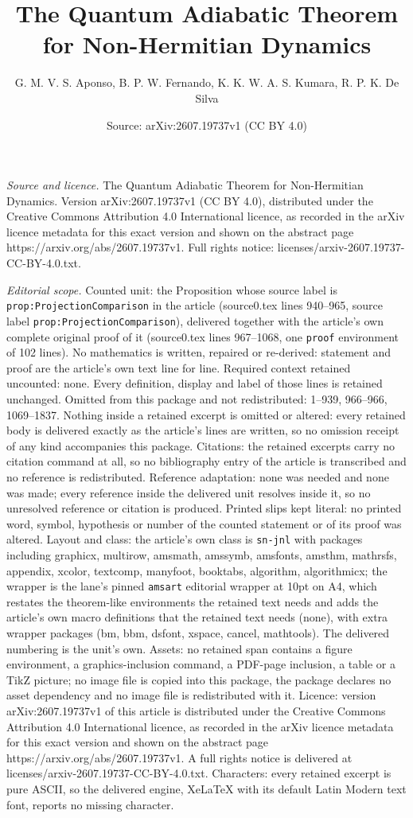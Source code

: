 \documentclass[10pt,a4paper]{amsart}
\title[The Quantum Adiabatic Theorem for Non-Hermitian Dynamics]{The Quantum Adiabatic Theorem for Non-Hermitian Dynamics}
\author{G. M. V. S. Aponso, B. P. W. Fernando, K. K. W. A. S. Kumara, R. P. K. De Silva}
\date{Source: arXiv:2607.19737v1 (CC BY 4.0)}
\begin{document}
\maketitle

\noindent\emph{Source and licence.} The Quantum Adiabatic Theorem for Non-Hermitian Dynamics. Version arXiv:2607.19737v1 (CC BY 4.0), distributed under the Creative Commons Attribution 4.0 International licence, as recorded in the arXiv licence metadata for this exact version and shown on the abstract page https://arxiv.org/abs/2607.19737v1. Full rights notice: licenses/arxiv-2607.19737-CC-BY-4.0.txt.\par\smallskip

\noindent\textit{Editorial scope.} Counted unit: the Proposition whose source label is \texttt{prop:ProjectionComparison} in the article (source0.tex lines 940--965, source label \texttt{prop:ProjectionComparison}), delivered together with the article's own complete original proof of it (source0.tex lines 967--1068, one \texttt{proof} environment of 102 lines). No mathematics is written, repaired or re-derived: statement and proof are the article's own text line for line. Required context retained uncounted: none. Every definition, display and label of those lines is retained unchanged. Omitted from this package and not redistributed: 1--939, 966--966, 1069--1837. Nothing inside a retained excerpt is omitted or altered: every retained body is delivered exactly as the article's lines are written, so no omission receipt of any kind accompanies this package. Citations: the retained excerpts carry no citation command at all, so no bibliography entry of the article is transcribed and no reference is redistributed. Reference adaptation: none was needed and none was made; every reference inside the delivered unit resolves inside it, so no unresolved reference or citation is produced. Printed slips kept literal: no printed word, symbol, hypothesis or number of the counted statement or of its proof was altered. Layout and class: the article's own class is \texttt{sn-jnl} with packages including graphicx, multirow, amsmath, amssymb, amsfonts, amsthm, mathrsfs, appendix, xcolor, textcomp, manyfoot, booktabs, algorithm, algorithmicx; the wrapper is the lane's pinned \texttt{amsart} editorial wrapper at 10pt on A4, which restates the theorem-like environments the retained text needs and adds the article's own macro definitions that the retained text needs (none), with extra wrapper packages (bm, bbm, dsfont, xspace, cancel, mathtools). The delivered numbering is the unit's own. Assets: no retained span contains a figure environment, a graphics-inclusion command, a PDF-page inclusion, a table or a TikZ picture; no image file is copied into this package, the package declares no asset dependency and no image file is redistributed with it. Licence: version arXiv:2607.19737v1 of this article is distributed under the Creative Commons Attribution 4.0 International licence, as recorded in the arXiv licence metadata for this exact version and shown on the abstract page https://arxiv.org/abs/2607.19737v1. A full rights notice is delivered at licenses/arxiv-2607.19737-CC-BY-4.0.txt. Characters: every retained excerpt is pure ASCII, so the delivered engine, XeLaTeX with its default Latin Modern text font, reports no missing character.
\end{document}
